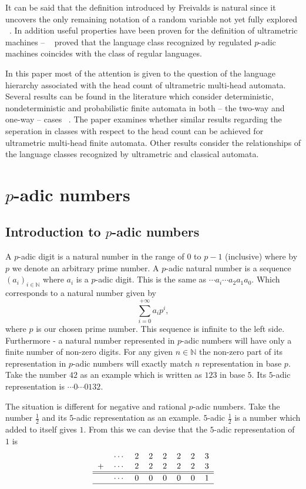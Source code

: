 \documentclass{llncs}
\begin{document}
It can be said that the definition introduced by Freivalds is natural since it uncovers the only remaining notation %
of a random variable not yet fully explored ~\citep{Freivalds2012}. In addition useful properties have been proven for the definition of ultrametric machines -- ~\citep{KasparsBalodis2013} proved that the language class recognized by regulated $p$-adic machines coincides with the class of regular languages.

In this paper most of the attention is given to the question of the language hierarchy associated with the head count of ultrametric multi-head automata. %
Several results can be found in the literature which consider deterministic, nondeterministic and probabilistic finite automata in both -- the two-way and one-way -- cases ~\citep{Holzer2009, Yao1978, Monien1980, Macarie1995}. The paper examines whether similar results regarding the seperation in classes with respect to the head count can be achieved for ultrametric multi-head finite automata. Other results consider the relationships of the language classes recognized by ultrametric and classical automata.

\chapter{$p$-adic numbers}
\section{Introduction to $p$-adic numbers}
A $p$-adic digit is a natural number in the range of $0$ to $p-1$ (inclusive) where by $p$ we denote an arbitrary prime number. A $p$-adic natural number is a sequence %
$(a_i)_{i \in \mathbb{N}}$ where $a_i$ is a $p$-adic digit. This is the same as $\cdots a_i \cdots a_2a_1a_0$.
Which corresponds to a natural number given by
\[
\sum\limits_{i=0}^{+\infty}a_ip^i,
\]
where $p$ is our chosen prime number. This sequence is infinite to the left side. Furthermore - a natural number represented in $p$-adic numbers will have only a finite number of non-zero digits. For any given $n \in \mathbb{N}$ the non-zero part of its representation in $p$-adic numbers will exactly match $n$ representation in base $p$. Take the number $42$ as an example which is written as $123$ in base $5$. Its $5$-adic representation is $\cdots 0 \cdots 0132$.

The situation is different for negative and rational $p$-adic numbers. Take the number $\frac{1}{2}$ and its $5$-adic representation as an example. $5$-adic $\frac{1}{2}$ is a number which added to itself gives $1$. From this we can devise that the $5$-adic representation of $1$ is  
\[
\begin{tabular}{rrrrrrrrr|}
&$\cdots$ &2 &2 &2 &2 &2 &3\\
+&$\cdots$ &2 &2 &2 &2 &2 &3\\
\hline
\hline
&$\cdots$ &0 &0 &0 &0 &0 &1\\
\hline
\end{tabular}
\]
\end{document}
